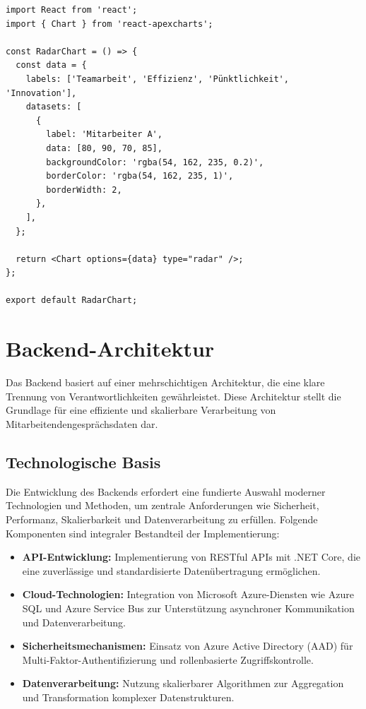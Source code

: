 \begin{verbatim}
import React from 'react';
import { Chart } from 'react-apexcharts';

const RadarChart = () => {
  const data = {
    labels: ['Teamarbeit', 'Effizienz', 'Pünktlichkeit', 'Innovation'],
    datasets: [
      {
        label: 'Mitarbeiter A',
        data: [80, 90, 70, 85],
        backgroundColor: 'rgba(54, 162, 235, 0.2)',
        borderColor: 'rgba(54, 162, 235, 1)',
        borderWidth: 2,
      },
    ],
  };

  return <Chart options={data} type="radar" />;
};

export default RadarChart;
\end{verbatim}


\section{Backend-Architektur}
Das Backend basiert auf einer mehrschichtigen Architektur, die eine klare Trennung von Verantwortlichkeiten gewährleistet. Diese Architektur stellt die Grundlage für eine effiziente und skalierbare Verarbeitung von Mitarbeitendengesprächsdaten dar.

\subsection{Technologische Basis}
Die Entwicklung des Backends erfordert eine fundierte Auswahl moderner Technologien und Methoden, um zentrale Anforderungen wie Sicherheit, Performanz, Skalierbarkeit und Datenverarbeitung zu erfüllen. Folgende Komponenten sind integraler Bestandteil der Implementierung:
\begin{itemize}
    \item \textbf{API-Entwicklung:} Implementierung von RESTful APIs mit .NET Core, die eine zuverlässige und standardisierte Datenübertragung ermöglichen.
    \item \textbf{Cloud-Technologien:} Integration von Microsoft Azure-Diensten wie Azure SQL und Azure Service Bus zur Unterstützung asynchroner Kommunikation und Datenverarbeitung.
    \item \textbf{Sicherheitsmechanismen:} Einsatz von Azure Active Directory (AAD) für Multi-Faktor-Authentifizierung und rollenbasierte Zugriffskontrolle.
    \item \textbf{Datenverarbeitung:} Nutzung skalierbarer Algorithmen zur Aggregation und Transformation komplexer Datenstrukturen.
\end{itemize}

